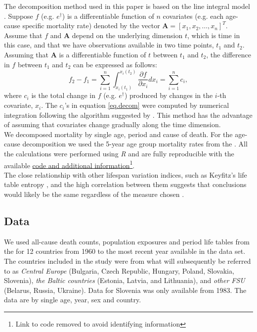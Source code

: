 \documentclass{article}
\newcommand{\vect}[1]{\boldsymbol{#1}}
\begin{document}
\begin{spacing}{1.5}
The decomposition method used in this paper is based on the line integral model \citet{horiuchi2008}. Suppose $f$ (e.g. $e^\dagger$) is a differentiable function of $n$ covariates (e.g. each age-cause specific mortality rate) denoted by the vector $\vect{A} = \left[x_1,x_2,\ldots,x_n \right]^T$. Assume that $f$ and $\vect{A}$ depend on the underlying dimension $t$, which is time in this case, and that we have observations available in two time points, $t_1$ and $t_2$. Assuming that $\vect{A}$ is a differentiable function of $t$ between $t_1$ and $t_2$, the difference in $f$ between $t_1$ and $t_2$ can be expressed as follows:
\begin{equation}
\label{eq.decom}
f_2-f_1 = \sum_{i = 1}^n \int_{x_i(t_1)}^{x_i(t_2)}\frac{\partial f}{\partial x_i}dx_i=\sum_{i = 1}^nc_i ,
\end{equation}
where $c_i$ is the total change in $f$ (e.g. $e^\dagger$) produced by changes in the $i$-th covariate, $x_i$. The $c_i$'s in equation \eqref{eq.decom} were computed by numerical integration following the algorithm suggested by \citet{horiuchi2008}. This method has the advantage of assuming that covariates change gradually along the time dimension.\\

We decomposed mortality by single age, period and cause of death. For the age-cause decomposition we used the 5-year age group mortality rates from the \cite{HcO}. All the calculations were performed using \textit{R} \citep{team2000r} and are fully reproducible with the available \href{}{code and additional information}\footnote{Link to code removed to avoid identifying information}.\\

The close relationship with other lifespan variation indices, such as Keyfitz's life table entropy \citep{vaupel&Canudas2003}, and the high correlation between them suggests that conclusions would likely be the same regardless of the measure chosen \citep{vanraalte2013,vaupel2011,wilmoth1999}.\\


\subsection*{Data}
We used all-cause death counts, population exposures and period life tables from the \citet{HMD} for 12 countries from 1960 to the most recent year available in the data set. The countries included in the study were from what will subsequently be referred to as \textit{Central Europe} (Bulgaria, Czech Republic, Hungary, Poland, Slovakia, Slovenia), \textit{the Baltic countries} (Estonia, Latvia, and Lithuania), and \textit{other FSU} (Belarus, Russia, Ukraine). Data for Slovenia was only available from 1983. The data are by single age, year, sex and country.\\


\end{spacing}
\end{document}
